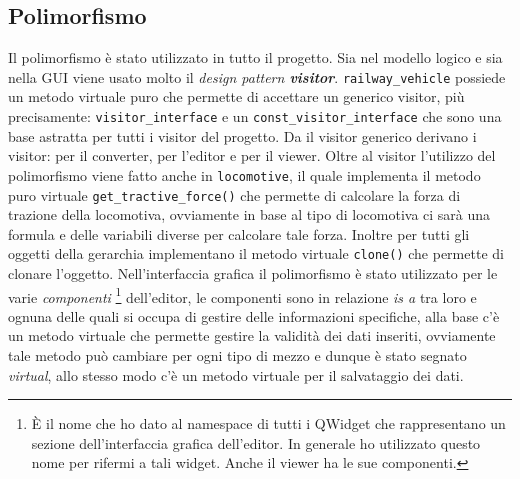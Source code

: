 \documentclass[a4paper,10pt]{article}
\begin{document}
\subsection {Polimorfismo}
Il polimorfismo è stato utilizzato in tutto il progetto. Sia nel modello logico e sia nella GUI viene usato molto il \emph{design pattern {\bfseries visitor}}. \texttt{railway\_vehicle} possiede un metodo virtuale puro che permette di accettare un generico visitor, più precisamente: \texttt{visitor\_interface} e un \texttt{const\_visitor\_interface} che sono una base astratta per tutti i visitor del progetto. Da il visitor generico derivano i visitor: per il converter, per l'editor e per il viewer. Oltre al visitor l'utilizzo del polimorfismo viene fatto anche in \texttt{locomotive}, il quale implementa il metodo puro virtuale \texttt{get\_tractive\_force()} che permette di calcolare la forza di trazione della locomotiva, ovviamente in base al tipo di locomotiva ci sarà una formula e delle variabili diverse per calcolare tale forza. Inoltre per tutti gli oggetti della gerarchia implementano il metodo virtuale \texttt{clone()} che permette di clonare l'oggetto. Nell'interfaccia grafica il polimorfismo è stato utilizzato per le varie \emph{componenti}%
\footnote{È il nome che ho dato al namespace di tutti i QWidget che rappresentano un sezione dell'interfaccia grafica dell'editor. In generale ho utilizzato questo nome per rifermi a tali widget. Anche il viewer ha le sue componenti.} 
dell'editor, le componenti sono in relazione \emph{is a} tra loro e ognuna delle quali si occupa di gestire delle informazioni specifiche, alla base c'è un metodo virtuale che permette gestire la validità dei dati inseriti, ovviamente tale metodo può cambiare per ogni tipo di mezzo e dunque è stato segnato \emph{virtual}, allo stesso modo c'è un metodo virtuale per il salvataggio dei dati. 
\end{document}

